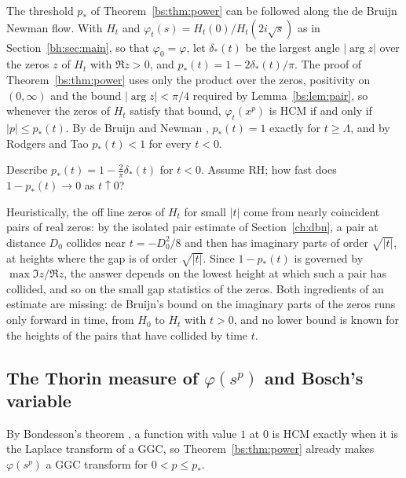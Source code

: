 The threshold $p_*$ of Theorem~\ref{bs:thm:power} can be followed along the de Bruijn Newman flow. With $H_t$ and $\varphi_t(s)=H_t(0)/H_t(2i\sqrt s)$ as in Section~\ref{bh:sec:main}, so that $\varphi_0=\varphi$, let $\delta_*(t)$ be the largest angle $|\arg z|$ over the zeros $z$ of $H_t$ with $\Re z>0$, and $p_*(t)=1-2\delta_*(t)/\pi$. The proof of Theorem~\ref{bs:thm:power} uses only the product over the zeros, positivity on $(0,\infty)$ and the bound $|\arg z|<\pi/4$ required by Lemma~\ref{bs:lem:pair}, so whenever the zeros of $H_t$ satisfy that bound, $\varphi_t(x^p)$ is HCM if and only if $|p|\le p_*(t)$. By de Bruijn \cite{deBruijn} and Newman \cite{Newman1976}, $p_*(t)=1$ exactly for $t\ge\Lambda$, and by Rodgers and Tao \cite{RodgersTao} $p_*(t)<1$ for every $t<0$.

\begin{question}\label{bs:q:four}
Describe $p_*(t)=1-\frac2\pi\delta_*(t)$ for $t<0$. Assume RH; how fast does $1-p_*(t)\to0$ as $t\uparrow0$?
\end{question}

Heuristically, the off line zeros of $H_t$ for small $|t|$ come from nearly coincident pairs of real zeros: by the isolated pair estimate of Section~\ref{ch:dbn}, a pair at distance $D_0$ collides near $t=-D_0^2/8$ and then has imaginary parts of order $\sqrt{|t|}$, at heights where the gap is of order $\sqrt{|t|}$. Since $1-p_*(t)$ is governed by $\max\Im z/\Re z$, the answer depends on the lowest height at which such a pair has collided, and so on the small gap statistics of the zeros. Both ingredients of an estimate are missing: de Bruijn's bound on the imaginary parts of the zeros runs only forward in time, from $H_0$ to $H_t$ with $t>0$, and no lower bound is known for the heights of the pairs that have collided by time $t$.

\subsection{The Thorin measure of $\varphi(s^p)$ and Bosch's variable}\label{bs:sec:thorin}

By Bondesson's theorem \cite[Theorem 6.1.1]{Bondesson}, a function with value $1$ at $0$ is HCM exactly when it is the Laplace transform of a GGC, so Theorem~\ref{bs:thm:power} already makes $\varphi(s^p)$ a GGC transform for $0<p\le p_*$.

